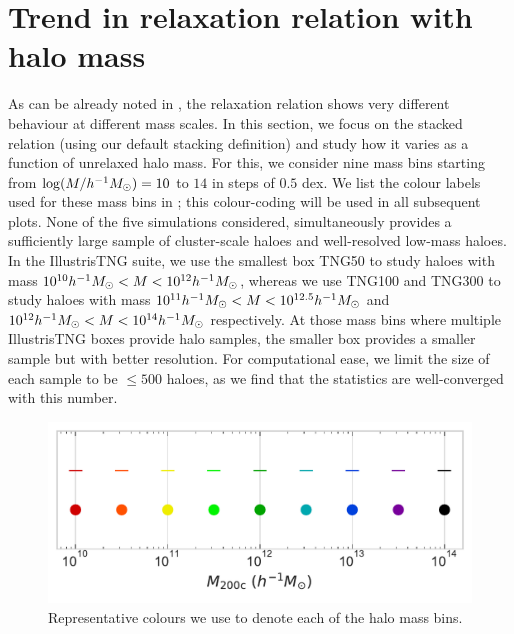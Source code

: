 \section{Trend in relaxation relation with halo mass}
\label{sec:results-mass-ch:z0main}
As can be already noted in , the relaxation relation shows very different behaviour at different mass scales. In this section, we focus on the stacked relation (using our default stacking definition) and study how it varies as a function of unrelaxed halo mass. For this, we consider nine mass bins starting from $\log (M/h^{-1}M_{\odot}) = 10$ to $14$ in steps of $0.5$ dex. We list the colour labels used for these mass bins in ; this colour-coding will be used in all subsequent plots. None of the five simulations considered, simultaneously provides a sufficiently large sample of cluster-scale haloes and well-resolved low-mass haloes.
In the IllustrisTNG suite, we use the smallest box TNG50 to study haloes with mass $10^{10} h^{-1}M_{\odot} < M < 10^{12} h^{-1}M_{\odot}$, whereas we use TNG100 and TNG300 to study haloes with mass $10^{11} h^{-1}M_{\odot} < M < 10^{12.5} h^{-1}M_{\odot}$ and $10^{12} h^{-1}M_{\odot} < M < 10^{14} h^{-1}M_{\odot}$ respectively. At those mass bins where multiple IllustrisTNG boxes provide halo samples, the smaller box provides a smaller sample but with better resolution. For computational ease, we limit the size of each sample to be $\leq500$ haloes, as we find that the statistics are well-converged with this number.

\begin{figure}
    \centering
    \includegraphics[width=0.69\linewidth]{plots/Mass_bin_labels.pdf}
    \caption{Representative colours we use to denote each of the halo mass bins.}
    \label{fig:mass_bin_label-ch:z0main}
\end{figure}


